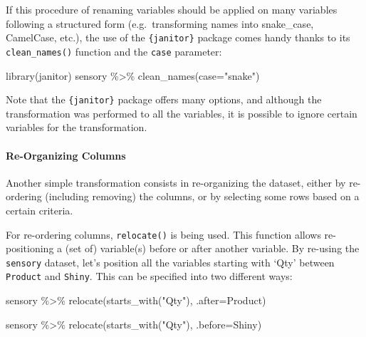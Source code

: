 \documentclass[
]{book}
\newenvironment{Shaded}{\begin{snugshade}}{\end{snugshade}}
\newcommand{\AttributeTok}[1]{\textcolor[rgb]{0.77,0.63,0.00}{#1}}
\newcommand{\FunctionTok}[1]{\textcolor[rgb]{0.00,0.00,0.00}{#1}}
\newcommand{\NormalTok}[1]{#1}
\newcommand{\SpecialCharTok}[1]{\textcolor[rgb]{0.00,0.00,0.00}{#1}}
\newcommand{\StringTok}[1]{\textcolor[rgb]{0.31,0.60,0.02}{#1}}
\begin{document}
If this procedure of renaming variables should be applied on many variables following a structured form (e.g.~transforming names into snake\_case, CamelCase, etc.), the use of the \texttt{\{janitor\}} package comes handy thanks to its \texttt{clean\_names()} function and the \texttt{case} parameter:

\begin{Shaded}
\begin{Highlighting}[]
\FunctionTok{library}\NormalTok{(janitor)}
\NormalTok{sensory }\SpecialCharTok{\%\textgreater{}\%} 
  \FunctionTok{clean\_names}\NormalTok{(}\AttributeTok{case=}\StringTok{"snake"}\NormalTok{)}
\end{Highlighting}
\end{Shaded}

Note that the \texttt{\{janitor\}} package offers many options, and although the transformation was performed to all the variables, it is possible to ignore certain variables for the transformation.

\hypertarget{re-organizing-columns}{%
\paragraph{Re-Organizing Columns}\label{re-organizing-columns}}

Another simple transformation consists in re-organizing the dataset, either by re-ordering (including removing) the columns, or by selecting some rows based on a certain criteria.

For re-ordering columns, \texttt{relocate()} is being used. This function allows re-positioning a (set of) variable(s) before or after another variable. By re-using the \texttt{sensory} dataset, let's position all the variables starting with `Qty' between \texttt{Product} and \texttt{Shiny}. This can be specified into two different ways:

\begin{Shaded}
\begin{Highlighting}[]
\NormalTok{sensory }\SpecialCharTok{\%\textgreater{}\%} 
  \FunctionTok{relocate}\NormalTok{(}\FunctionTok{starts\_with}\NormalTok{(}\StringTok{"Qty"}\NormalTok{), }\AttributeTok{.after=}\NormalTok{Product)}

\NormalTok{sensory }\SpecialCharTok{\%\textgreater{}\%} 
  \FunctionTok{relocate}\NormalTok{(}\FunctionTok{starts\_with}\NormalTok{(}\StringTok{"Qty"}\NormalTok{), }\AttributeTok{.before=}\NormalTok{Shiny)}
\end{Highlighting}
\end{Shaded}
\end{document}
